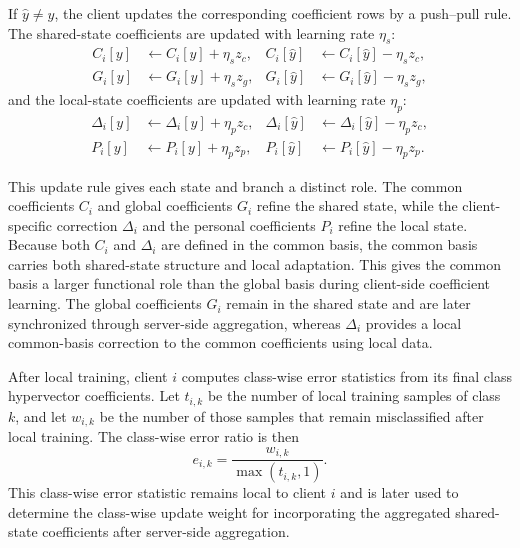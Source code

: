 \documentclass[lettersize,journal]{IEEEtran}
\newcommand{\rev}[1]{#1}
\begin{document}
If $\hat{y}\neq y$, the client updates the corresponding coefficient rows by a push--pull rule.
The \rev{shared-state coefficients} are updated with learning rate $\eta_s$:
\begin{align}
\label{eq:update_common}
C_i[y] &\leftarrow C_i[y] + \eta_s z_c, &
C_i[\hat{y}] &\leftarrow C_i[\hat{y}] - \eta_s z_c,\\
\label{eq:update_global}
G_i[y] &\leftarrow G_i[y] + \eta_s z_g, &
G_i[\hat{y}] &\leftarrow G_i[\hat{y}] - \eta_s z_g,
\end{align}
and the \rev{local-state coefficients} are updated with learning rate $\eta_p$:
\begin{align}
\label{eq:update_delta}
\Delta_i[y] &\leftarrow \Delta_i[y] + \eta_p z_c, &
\Delta_i[\hat{y}] &\leftarrow \Delta_i[\hat{y}] - \eta_p z_c,\\
\label{eq:update_personal}
P_i[y] &\leftarrow P_i[y] + \eta_p z_p, &
P_i[\hat{y}] &\leftarrow P_i[\hat{y}] - \eta_p z_p.
\end{align}



This update rule gives each state and branch a distinct role.
The common coefficients $C_i$ and global coefficients $G_i$ refine the \rev{shared state}, while the client-specific correction $\Delta_i$ and the personal coefficients $P_i$ refine the \rev{local state}.
Because both $C_i$ and $\Delta_i$ are defined in the common basis, the common basis carries both \rev{shared-state structure and local adaptation}.
This gives the common basis a larger functional role than the global basis during \rev{client-side coefficient learning}.
The global coefficients $G_i$ remain in the \rev{shared state} and are later synchronized through server-side aggregation, whereas $\Delta_i$ provides a \rev{local common-basis correction} to the common coefficients using local data.

After local training, client $i$ computes class-wise error statistics from its final class hypervector coefficients.
Let $t_{i,k}$ be the number of local training samples of class $k$, and let $w_{i,k}$ be the number of those samples that remain misclassified after local training.
The class-wise error ratio is then
\begin{equation}
\label{eq:error_ratio}
e_{i,k}
=
\frac{w_{i,k}}{\max(t_{i,k},1)}.
\end{equation}
This class-wise error statistic remains local to client $i$ and is later used to determine the class-wise update weight for incorporating the aggregated \rev{shared-state coefficients} after server-side aggregation.
\end{document}
